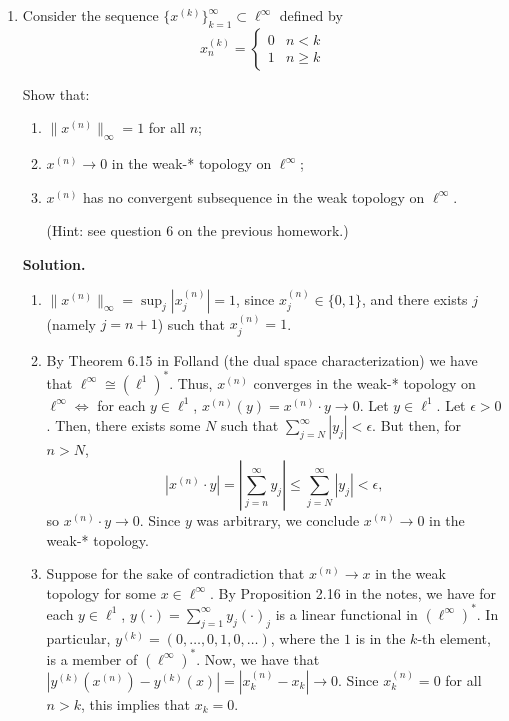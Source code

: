 \documentclass[11pt]{article}
\begin{document}
\begin{enumerate}[label=\arabic*.]
\vspace{1em}

\item Consider the sequence $\{x^{(k)}\}_{k=1}^{\infty} \subset \ell^\infty$ defined by
\[
x^{(k)}_n =
\begin{cases}
0 & n < k \\
1 & n \ge k
\end{cases}
\]

Show that:
\begin{enumerate}[label=(\alph*)]
\item $\|x^{(n)}\|_{\infty} = 1$ for all $n$;
\item $x^{(n)} \to 0$ in the weak-* topology on $\ell^\infty$;
\item $x^{(n)}$ has no convergent subsequence in the weak topology on $\ell^\infty$.

(Hint: see question 6 on the previous homework.)
\end{enumerate}

\vspace{1em}

\textbf{Solution.}

\begin{enumerate}
    \item $\|x^{(n)}\|_{\infty} = \sup_{j}|x_j^{(n)}| = 1$, since $x_j^{(n)} \in \{0, 1\} $, and there exists $j$ (namely $j = n+1$) such that $x_j^{(n)} = 1$.
    \item By Theorem 6.15 in Folland (the dual space characterization) we have that $\ell^{\infty} \cong (\ell^{1})^{*}$.
        Thus, $x^{(n)}$ converges in the weak-* topology on $\ell^{\infty} \iff$  for each $y \in \ell^{1}$, $x^{(n)}(y) = x^{(n)}\cdot y \to 0$.
        Let $y \in \ell^{1}$.
        Let $\epsilon > 0$.
        Then, there exists some $N$ such that $\sum_{j=N}^{\infty} |y_j| < \epsilon$.
        But then, for $n > N$,
        \[
        |x^{(n)}\cdot y| = \left| \sum_{j=n}^{\infty} y_j \right| \leq \sum_{j=N}^{\infty} |y_j| < \epsilon
        ,\] 
        so $x^{(n)}\cdot y \to 0$.
        Since $y$ was arbitrary, we conclude $x^{(n)} \to 0$ in the weak-* topology.

    \item Suppose for the sake of contradiction that $x^{(n)} \to x$ in the weak topology for some $x \in \ell^{\infty}$.
        By Proposition 2.16 in the notes, we have for each $y \in \ell^{1}$, $y(\cdot) = \sum_{j=1}^{\infty} y_j  (\cdot )_j$ is a linear functional in $(\ell^{\infty})^{*}$.
        In particular, $y^{(k)} = (0, \ldots, 0, 1, 0, \ldots)$, where the $1$ is in the $k$-th element, is a member of $(\ell^{\infty})^{*}$.
        Now, we have that $|y^{(k)}(x^{(n)}) - y^{(k)}(x)| = |x^{(n)}_k - x_k| \to 0 $.
        Since $x^{(n)}_k = 0$ for all $n > k$, this implies that $x_k = 0$.



\end{enumerate}
\end{enumerate}
\end{document}
